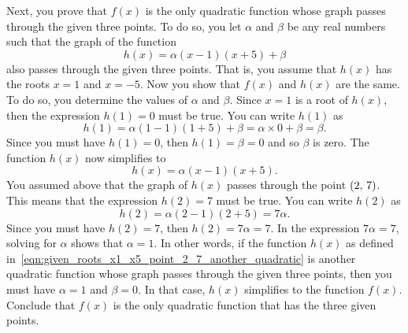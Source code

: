 \documentclass[a4paper,oneside,12pt]{article}
\begin{document}
\begin{problem}
{\begin{solution}
Next, you prove that $f(x)$ is the only quadratic function whose graph
passes through the given three points.  To do so, you let $\alpha$ and
$\beta$ be any real numbers such that the graph of the function
\begin{equation}
\label{eqn:given_roots_x1_x5_point_2_7_another_quadratic}
h(x)
=
\alpha (x - 1) (x + 5) + \beta
\end{equation}
also passes through the given three points.  That is, you assume that
$h(x)$ has the roots $x = 1$ and $x = -5$.  Now you show that $f(x)$
and $h(x)$ are the same.  To do so, you determine the values of
$\alpha$ and $\beta$.  Since $x = 1$ is a root of $h(x)$, then the
expression $h(1) = 0$ must be true.  You can write $h(1)$ as
\[
h(1)
=
\alpha (1 - 1) (1 + 5) + \beta
=
\alpha \times 0 + \beta
=
\beta.
\]
Since you must have $h(1) = 0$, then $h(1) = \beta = 0$ and so $\beta$
is zero.  The function $h(x)$ now simplifies to
\[
h(x)
=
\alpha (x - 1) (x + 5).
\]
You assumed above that the graph of $h(x)$ passes through the point
$\left\lparen{2},\, {7}\right\rparen$.  This means that the expression $h(2) = 7$ must be
true.  You can write $h(2)$ as
\[
h(2)
=
\alpha (2 - 1) (2 + 5)
=
7 \alpha.
\]
Since you must have $h(2) = 7$, then $h(2) = 7\alpha = 7$.  In the
expression $7\alpha = 7$, solving for $\alpha$ shows that
$\alpha = 1$.  In other words, if the function $h(x)$ as defined
in~\eqref{eqn:given_roots_x1_x5_point_2_7_another_quadratic} is
another quadratic function whose graph passes through the given three
points, then you must have $\alpha = 1$ and $\beta = 0$.  In that
case, $h(x)$ simplifies to the function $f(x)$.  Conclude that $f(x)$
is the only quadratic function that has the three given points.
\end{solution}
}{}


\end{problem}
\end{document}
